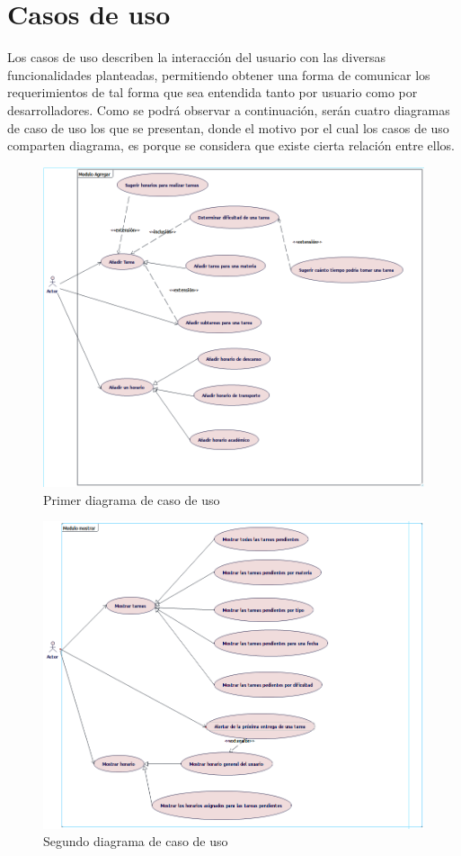 \section{Casos de uso}
Los casos de uso describen la interacción del usuario con las diversas funcionalidades planteadas, permitiendo obtener una forma de comunicar los requerimientos de tal forma que sea entendida tanto por usuario como por desarrolladores. Como se podrá observar a continuación, serán cuatro diagramas de caso de uso los que se presentan, donde el motivo por el cual los casos de uso comparten diagrama, es porque se considera que existe cierta relación entre ellos.



\begin{figure}[H]
	\centering
	\includegraphics[width=0.7\linewidth]{diseno/requerimientos/imagenes/casouso1}
	\caption{Primer diagrama de caso de uso}
	\label{fig:gantt}
\end{figure}
\begin{figure}[H]
	\centering
	\includegraphics[width=0.7\linewidth]{diseno/requerimientos/imagenes/casouso2}
	\caption{Segundo diagrama de caso de uso}
	\label{fig:gantt}
\end{figure}
